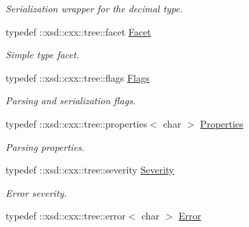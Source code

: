 \begin{DoxyCompactItemize}
\begin{DoxyCompactList}\small\item\em Serialization wrapper for the decimal type. \item\end{DoxyCompactList}\item 
\hypertarget{namespacexml__schema_a67625d5062557951330d2dccee220f7d}{
typedef ::xsd::cxx::tree::facet \hyperlink{namespacexml__schema_a67625d5062557951330d2dccee220f7d}{Facet}}
\label{namespacexml__schema_a67625d5062557951330d2dccee220f7d}

\begin{DoxyCompactList}\small\item\em Simple type facet. \item\end{DoxyCompactList}\item 
\hypertarget{namespacexml__schema_affb4c227cbd9aa7453dd1dc5a1401943}{
typedef ::xsd::cxx::tree::flags \hyperlink{namespacexml__schema_affb4c227cbd9aa7453dd1dc5a1401943}{Flags}}
\label{namespacexml__schema_affb4c227cbd9aa7453dd1dc5a1401943}

\begin{DoxyCompactList}\small\item\em Parsing and serialization flags. \item\end{DoxyCompactList}\item 
\hypertarget{namespacexml__schema_ad27ce19a7ee1d3b1064092648898f64c}{
typedef ::xsd::cxx::tree::properties$<$ char $>$ \hyperlink{namespacexml__schema_ad27ce19a7ee1d3b1064092648898f64c}{Properties}}
\label{namespacexml__schema_ad27ce19a7ee1d3b1064092648898f64c}

\begin{DoxyCompactList}\small\item\em Parsing properties. \item\end{DoxyCompactList}\item 
\hypertarget{namespacexml__schema_a1385d97f1fb2a3b623185e7ef2a12c08}{
typedef ::xsd::cxx::tree::severity \hyperlink{namespacexml__schema_a1385d97f1fb2a3b623185e7ef2a12c08}{Severity}}
\label{namespacexml__schema_a1385d97f1fb2a3b623185e7ef2a12c08}

\begin{DoxyCompactList}\small\item\em Error severity. \item\end{DoxyCompactList}\item 
\hypertarget{namespacexml__schema_a21e804b3775e71d965fc63126fa6f4cb}{
typedef ::xsd::cxx::tree::error$<$ char $>$ \hyperlink{namespacexml__schema_a21e804b3775e71d965fc63126fa6f4cb}{Error}}
\label{namespacexml__schema_a21e804b3775e71d965fc63126fa6f4cb}


\end{DoxyCompactItemize}
